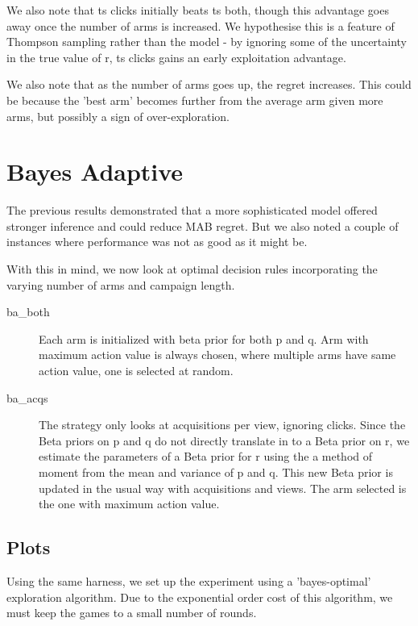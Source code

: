 \documentclass[11pt,a4,singlespacing,titlepagenumber=on]{scrreprt}
\numberwithin{equation}{chapter} %
\theoremstyle{remark}
\begin{document}
We also note that ts clicks initially beats ts both, though this advantage goes away once the number of arms is increased. We hypothesise this is a feature of Thompson sampling rather than the model - by ignoring some of the uncertainty in the true value of r, ts clicks gains an early exploitation advantage.

We also note that as the number of arms goes up, the regret increases. This could be because the 'best arm' becomes further from the average arm given more arms, but possibly a sign of over-exploration.


\section{ Bayes Adaptive }

The previous results demonstrated that a more sophisticated model offered stronger inference and could reduce MAB regret. But we also noted a couple of instances where performance was not as good as it might be. 

With this in mind, we now look at optimal decision rules incorporating the varying number of arms and campaign length.

\begin{description}
	\item[ba\_both] Each arm is initialized with beta prior for both p and q. Arm with maximum action value is always chosen, where multiple arms have same action value, one is selected at random.
	\item[ba\_acqs] The strategy only looks at acquisitions per view, ignoring clicks. Since the Beta priors on p and q do not directly translate in to a Beta prior on r, we estimate the parameters of a Beta prior for r using the a method of moment from the mean and variance of p and q. This new Beta prior is updated in the usual way with acquisitions and views. The arm selected is the one with maximum action value.
\end{description}




\subsection{Plots}

Using the same harness, we set up the experiment using a 'bayes-optimal' exploration algorithm. Due to the exponential order cost of this algorithm, we must keep the games to a small number of rounds. 
\end{document}
